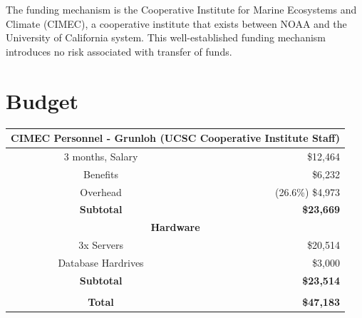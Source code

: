 \documentclass[12pt]{article}
\begin{document}
%
The funding mechanism is the Cooperative Institute for Marine Ecosystems and Climate (CIMEC), a cooperative institute that exists between NOAA and the University of California system.
This well-established funding mechanism introduces no risk associated with transfer of funds.

%

%
%

%
\clearpage
{}
\section{Budget}
\begin{center}
\begin{tabular}{c|r}
\multicolumn{2}{c}{\bfseries CIMEC Personnel - Grunloh (UCSC Cooperative Institute Staff)}\\\hline
3 months, Salary 		& \$12,464\\ 
Benefits  			& \$6,232\\ 
Overhead			& (26.6\%) \$4,973\\\hline
\textbf{Subtotal} 		& \textbf{\$23,669}\\

\multicolumn{2}{c}{\bfseries Hardware}\\
\hline
3x Servers 			& \$20,514\\
Database Hardrives 			& \$3,000\\\hline
\textbf{Subtotal}			& \textbf{\$23,514}\\
\multicolumn{2}{c}{}\\\hline
\textbf{Total}				& \textbf{\$47,183}\\
\end{tabular}
\end{center}
\end{document}
